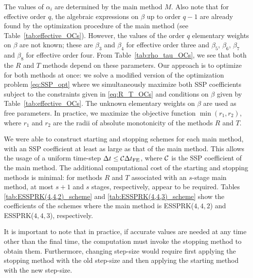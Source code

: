 \documentclass[final]{siamltex}  %
\begin{document}
The values of $\alpha_i$ are determined by the main method $M$.
Also note that for effective order $q$, the algebraic expressions on
$\beta$ up to order $q-1$ are already found by the optimization procedure of 
the main method (see Table~\ref{tab:effective_OCs}). 
However, the values of the order $q$ elementary weights on $\beta$ are not 
known; these are $\beta_3$ and $\beta_4$ for effective order three and
$\beta_5$, $\beta_6$, $\beta_7$ and $\beta_8$ for effective order four.
From Table~\ref{tab:rho_tau_OCs}, we see that both the $R$ and $T$
methods depend on these parameters.
Our approach is to optimize for both methods at once: we solve a
modified version of the optimization problem \eqref{eq:SSP_opt} where
we simultaneously maximize both SSP coefficients subject to the
constraints given in \eqref{eq:R_T_OCs} and conditions on $\beta$ given by 
Table~\ref{tab:effective_OCs}. 
The unknown elementary weights on $\beta$ are used as free parameters.
In practice, we maximize the objective function $\min(r_1,r_2)$, where $r_1$ 
and $r_2$ are the radii of absolute monotonicity of the methods $R$ and $T$.

We were able to construct starting and stopping schemes for each main 
method, with an SSP coefficient at least as large as that of the main method.
This allows the usage of a uniform time-step $\Delta t \leq \mathcal{C}\Delta t_{\textnormal{FE}}$, 
where $\mathcal{C}$ is the SSP coefficient of the main method.
The additional computational cost
of the starting and stopping methods is minimal:
for methods $R$ and $T$ associated with an $s$-stage main method,
at most $s + 1$ and $s$ stages, respectively, appear to be required.
Tables \ref{tab:ESSPRK(4,4,2)_scheme} and \ref{tab:ESSPRK(4,4,3)_scheme} 
show the coefficients of the schemes where the main 
method is ESSPRK($4,4,2$) and ESSPRK($4,4,3$), respectively. 

It is important to note that in practice, if accurate values are needed at 
any time other than the final time, the computation must invoke the 
stopping method to obtain them.  Furthermore, changing step-size would 
require first applying the stopping method with the old step-size and then 
applying the starting method with the new step-size.
\end{document}
